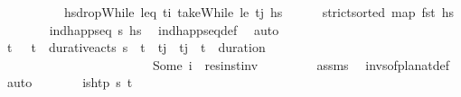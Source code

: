 \begin{isabellebody}
%
\isadelimproof
\ \ %
\endisadelimproof
%
\isatagproof
{}\isamarkupfalse%
\ {\isacharminus}{\kern0pt}\isanewline
\ \ \ \ \isamarkupfalse%
\ {\isacharquery}{\kern0pt}hs{\isacharprime}{\kern0pt}{\isacharequal}{\kern0pt}{\isachardoublequoteopen}dropWhile\ {\isacharparenleft}{\kern0pt}leq\ t\isactrlsub i{\isacharparenright}{\kern0pt}\ {\isacharparenleft}{\kern0pt}takeWhile\ {\isacharparenleft}{\kern0pt}le\ t\isactrlsub j{\isacharparenright}{\kern0pt}\ hs{\isacharparenright}{\kern0pt}{\isachardoublequoteclose}\isanewline
\ \ \ \ \isamarkupfalse%
\ {\isachardoublequoteopen}strict{\isacharunderscore}{\kern0pt}sorted\ {\isacharparenleft}{\kern0pt}map\ fst\ hs{\isacharparenright}{\kern0pt}{\isachardoublequoteclose}\isanewline
\ \ \ \ \ \ \isamarkupfalse%
\ {\isacartoucheopen}ind{\isacharunderscore}{\kern0pt}happ{\isacharunderscore}{\kern0pt}seq\ {\isasympi}s\ hs{\isacartoucheclose}\ \isamarkupfalse%
\ ind{\isacharunderscore}{\kern0pt}happ{\isacharunderscore}{\kern0pt}seq{\isacharunderscore}{\kern0pt}def\ \isamarkupfalse%
\ auto\isanewline
\ \ \ \ \isamarkupfalse%
\ t\isactrlsub {\isasympi}\ {\isasympi}\ \ {\isachardoublequoteopen}{\isacharparenleft}{\kern0pt}t\isactrlsub {\isasympi}{\isacharcomma}{\kern0pt}{\isasympi}{\isacharparenright}{\kern0pt}\ {\isasymin}\ durative{\isacharunderscore}{\kern0pt}acts\ {\isasympi}s{\isachardoublequoteclose}\ \ {\isachardoublequoteopen}t\isactrlsub {\isasympi}\ {\isacharless}{\kern0pt}\ t\isactrlsub j\ {\isasymand}\ t\isactrlsub j\ {\isasymle}\ t\isactrlsub {\isasympi}\ {\isacharplus}{\kern0pt}\ {\isacharparenleft}{\kern0pt}duration\ {\isasympi}{\isacharparenright}{\kern0pt}{\isachardoublequoteclose}\isanewline
\ \ \ \ \ \ \ \ \ \ \ \ \ \ \ \ \ \ \ \ \ \ \ \ {\isachardoublequoteopen}Some\ i\ {\isacharequal}{\kern0pt}\ res{\isacharunderscore}{\kern0pt}inst{\isacharunderscore}{\kern0pt}inv\ {\isasympi}{\isachardoublequoteclose}\isanewline
\ \ \ \ \ \ \isamarkupfalse%
\ assms\ \isamarkupfalse%
\ invs{\isacharunderscore}{\kern0pt}of{\isacharunderscore}{\kern0pt}plan{\isacharunderscore}{\kern0pt}at{\isacharunderscore}{\kern0pt}def\ \isamarkupfalse%
\ auto\isanewline
\ \ \ \ \isamarkupfalse%
\ \isamarkupfalse%
\ {\isachardoublequoteopen}is{\isacharunderscore}{\kern0pt}htp\ {\isasympi}s\ t\isactrlsub {\isasympi}{\isachardoublequoteclose}\isanewline

\end{isabellebody}
